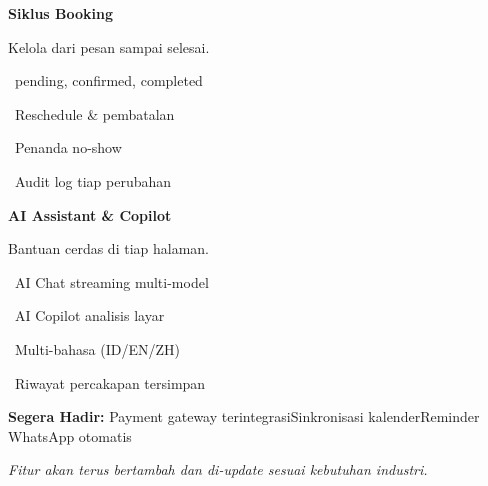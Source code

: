 \documentclass[a4paper]{article}
\begin{document}
\noindent
\begin{minipage}[t]{0.485\textwidth}
    \colorbox{OrangePrimary}{%
        \begin{minipage}{\dimexpr\textwidth-2\fboxsep\relax}
            {\fontsize{10}{13}\selectfont\bfseries\color{White} Siklus Booking}
        \end{minipage}}\par
    \vspace{4pt}
    {\fontsize{9}{12}\selectfont\color{TextDark}%
    Kelola dari pesan sampai selesai.\par\vspace{3pt}
    \textbullet\ pending, confirmed, completed\par\vspace{2pt}%
    \textbullet\ Reschedule \& pembatalan\par\vspace{2pt}%
    \textbullet\ Penanda no-show\par\vspace{2pt}%
    \textbullet\ Audit log tiap perubahan}%

\end{minipage}%
\hfill
\begin{minipage}[t]{0.485\textwidth}
    \colorbox{EmeraldDark}{%
        \begin{minipage}{\dimexpr\textwidth-2\fboxsep\relax}
            {\fontsize{10}{13}\selectfont\bfseries\color{White} AI Assistant \& Copilot}
        \end{minipage}}\par
    \vspace{4pt}
    {\fontsize{9}{12}\selectfont\color{TextDark}%
    Bantuan cerdas di tiap halaman.\par\vspace{3pt}
    \textbullet\ AI Chat streaming multi-model\par\vspace{2pt}%
    \textbullet\ AI Copilot analisis layar\par\vspace{2pt}%
    \textbullet\ Multi-bahasa (ID/EN/ZH)\par\vspace{2pt}%
    \textbullet\ Riwayat percakapan tersimpan}%

\end{minipage}

\vspace{8pt}

{\setlength{\fboxsep}{8pt}\setlength{\fboxrule}{0pt}%
\noindent\colorbox{BlueBg}{%
    \begin{minipage}{\dimexpr\textwidth-2\fboxsep\relax}
        {\fontsize{9}{12}\selectfont\bfseries\color{BlueDark} Segera Hadir:}\enspace
        {\fontsize{9}{12}\selectfont\color{TextDark} Payment gateway terintegrasi\enspace\textcolor{BluePrimary}{\textbullet}\enspace Sinkronisasi kalender\enspace\textcolor{BluePrimary}{\textbullet}\enspace Reminder WhatsApp otomatis}\par\vspace{3pt}
        {\fontsize{8.5}{11}\selectfont\color{TextLight}\textit{Fitur akan terus bertambah dan di-update sesuai kebutuhan industri.}}
    \end{minipage}}}
\end{document}
